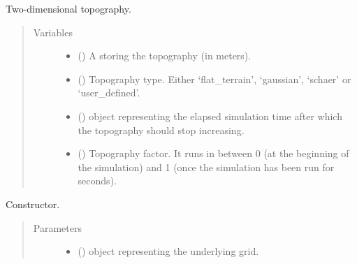\documentclass[letterpaper,10pt,english]{sphinxmanual}
\begin{document}
\begin{fulllineitems}
\label{\detokenize{api:grids.topography.Topography2d}}
Two-dimensional topography.
\begin{quote}\begin{description}
\item[{Variables}] \leavevmode\begin{itemize}
\item {} 
 () \textendash{} A  storing the topography (in meters).

\item {} 
 () \textendash{} Topography type. Either ‘flat\_terrain’, ‘gaussian’, ‘schaer’ or ‘user\_defined’.

\item {} 
 () \textendash{}  object representing the elapsed simulation time
after which the topography should stop increasing.

\item {} 
 () \textendash{} Topography factor. It runs in between 0 (at the beginning of the
simulation) and 1 (once the simulation has been run for  seconds).

\end{itemize}

\end{description}\end{quote}

\begin{fulllineitems}
\label{\detokenize{api:grids.topography.Topography2d.__init__}}
Constructor.
\begin{quote}\begin{description}
\item[{Parameters}] \leavevmode\begin{itemize}
\item {} 
 () \textendash{} {\hyperref[\detokenize{api:grids.xy_grid.XYGrid}]{}} object representing the underlying grid.


\end{itemize}
\end{description}
\end{quote}
\end{fulllineitems}
\end{fulllineitems}
\end{document}
